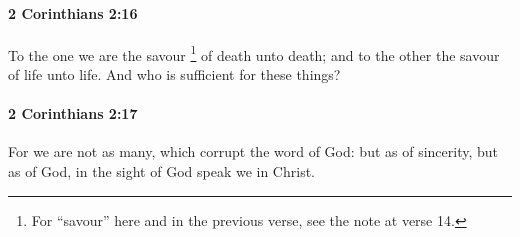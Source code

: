 		\paragraph{2 Corinthians 2:16} %
			\label{2CORINTHIANS-2-16}

			To the one we are the savour%
			\footnote{%
				For ``savour'' here and in the previous verse, see the note at verse 14.
				}
			of death unto death; and to the other the savour of life unto life.  And who is sufficient for these things?

			\begin{framed}
			\scriptsize
				\begin{compactdesc}
					\item[SBLG] 
				\end{compactdesc}
			\end{framed}

		\paragraph{2 Corinthians 2:17} %
			\label{2CORINTHIANS-2-17}

			For we are not as many, which corrupt the word of God: but as of sincerity, but as of God, in the sight of God speak we in Christ.

